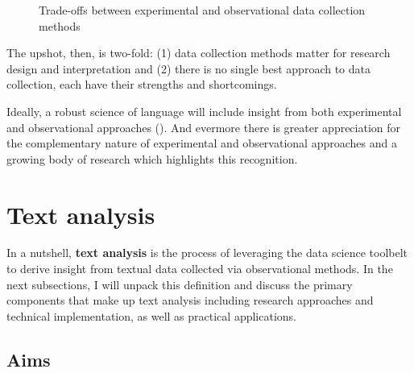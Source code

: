 \documentclass[
  letterpaper,
  krantz1]{latex/krantz-mod}
\theoremstyle{definition}
\theoremstyle{definition}
\theoremstyle{remark}
\begin{document}
\begin{figure}[!htb]


\caption{\label{fig-data-collection-methods}Trade-offs between
experimental and observational data collection methods}

\end{figure}%

The upshot, then, is two-fold: (1) data collection methods matter for
research design and
interpretation and (2) there is no single
best approach to data collection, each have their strengths and
shortcomings.

Ideally, a robust science of language will include insight from both
experimental and observational approaches
(). And evermore there
is greater appreciation for the complementary nature of experimental and
observational approaches and a growing body of research which highlights
this recognition.

\section{Text analysis}\label{text-analysis}

In a nutshell, \textbf{text analysis}  is the
process of leveraging the data science toolbelt to
derive insight from textual data collected via observational methods. In
the next subsections, I will unpack this definition and discuss the
primary components that make up text analysis including research
approaches and technical implementation, as well as practical
applications.

\subsection{Aims}\label{aims}
\end{document}
